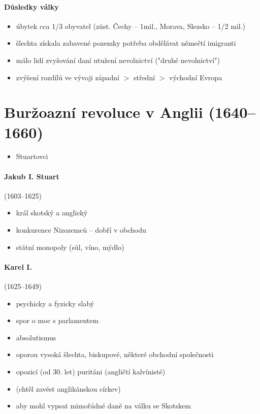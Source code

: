 \begin{itemize}
\paragraph{Důsledky války}
\begin{itemize}
\item úbytek cca 1/3 obyvatel (zůst. Čechy -- 1mil., Morava, Slezsko -- 1/2 mil.)
\item šlechta získala zabavené pozemky \ra potřeba obdělávat \ra němečtí imigranti
\item málo lidí \ra zvyšování daní \ra utužení nevolnictví ("druhé nevolnictví")
\item zvýšení rozdílů ve vývoji západní $>$ střední $>$ východní Evropa
\end{itemize}

\end{itemize}



\section{Buržoazní revoluce v Anglii (1640--1660)}
\begin{itemize}
\item Stuartovci
\end{itemize}

\paragraph{Jakub I. Stuart}(1603--1625)
\begin{itemize}
\item král skotský a anglický
\item konkurence Nizozemců -- dobří v obchodu
\item státní monopoly (sůl, víno, mýdlo)
\end{itemize}

\paragraph{Karel I.}(1625--1649)
\begin{itemize}
\item psychicky a fyzicky slabý
\item spor o moc s parlamentem
\item {} \ra absolutismus
\item oporou vysoká šlechta, biskupové, některé obchodní společnosti
\item opozicí (od 30. let) puritáni (angličtí kalvínisté)
\item {} (chtěl zavést anglikánskou církev)
\item {} aby mohl vypsat mimořádné daně na válku se Skotskem
\end{itemize}

